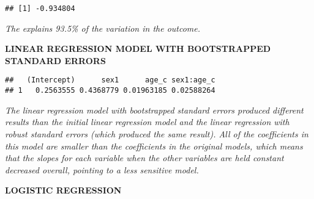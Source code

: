 \documentclass[]{article}
\newenvironment{Shaded}{\begin{snugshade}}{\end{snugshade}}
\newcommand{\CommentTok}[1]{\textcolor[rgb]{0.56,0.35,0.01}{\textit{#1}}}
\newcommand{\DataTypeTok}[1]{\textcolor[rgb]{0.13,0.29,0.53}{#1}}
\newcommand{\DecValTok}[1]{\textcolor[rgb]{0.00,0.00,0.81}{#1}}
\newcommand{\FloatTok}[1]{\textcolor[rgb]{0.00,0.00,0.81}{#1}}
\newcommand{\KeywordTok}[1]{\textcolor[rgb]{0.13,0.29,0.53}{\textbf{#1}}}
\newcommand{\NormalTok}[1]{#1}
\newcommand{\OperatorTok}[1]{\textcolor[rgb]{0.81,0.36,0.00}{\textbf{#1}}}
\newcommand{\OtherTok}[1]{\textcolor[rgb]{0.56,0.35,0.01}{#1}}
\newcommand{\StringTok}[1]{\textcolor[rgb]{0.31,0.60,0.02}{#1}}
\begin{document}
\begin{verbatim}
## [1] -0.934804
\end{verbatim}

\emph{The explains 93.5\% of the variation in the outcome.}

\textbf{LINEAR REGRESSION MODEL WITH BOOTSTRAPPED STANDARD ERRORS}

\begin{Shaded}
\end{Shaded}

\begin{verbatim}
##   (Intercept)      sex1      age_c sex1:age_c
## 1   0.2563555 0.4368779 0.01963185 0.02588264
\end{verbatim}

\emph{The linear regression model with bootstrapped standard errors
produced different results than the initial linear regression model and
the linear regression with robust standard errors (which produced the
same result). All of the coefficients in this model are smaller than the
coefficients in the original models, which means that the slopes for
each variable when the other variables are held constant decreased
overall, pointing to a less sensitive model.}

\textbf{LOGISTIC REGRESSION}

\begin{Shaded}
\end{Shaded}
\end{document}
